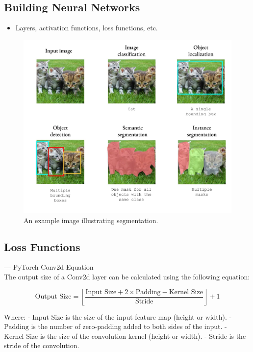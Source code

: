 \documentclass{article}
\begin{document}
\subsection{Building Neural Networks}
\begin{itemize}
    \item Layers, activation functions, loss functions, etc.
\end{itemize}


\begin{figure}[H]
    \centering
    \includegraphics[width=\linewidth]{../fig/segmentation_explain.png} %
    \caption{An example image illustrating segmentation.}
    \label{fig:example}
\end{figure}

\subsection{Loss Functions}

--- PyTorch Conv2d Equation \\

The output size of a Conv2d layer can be calculated using the following equation:

\[ \text{Output Size} = \left\lfloor \frac{\text{Input Size} + 2 \times \text{Padding} - \text{Kernel Size}}{\text{Stride}} \right\rfloor + 1 \]

Where:
- \(\text{Input Size}\) is the size of the input feature map (height or width).
- \(\text{Padding}\) is the number of zero-padding added to both sides of the input.
- \(\text{Kernel Size}\) is the size of the convolution kernel (height or width).
- \(\text{Stride}\) is the stride of the convolution.
\end{document}
